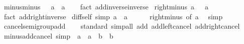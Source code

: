 \begin{isabellebody}
\endisatagproof
{\isafoldproof}%
%
\isadelimproof
\isanewline
%
\endisadelimproof
\isanewline
{}\isamarkupfalse%
\ minus{\isacharunderscore}{\kern0pt}minus{\isacharcolon}{\kern0pt}\ {\isachardoublequoteopen}{\isacharminus}{\kern0pt}\ {\isacharparenleft}{\kern0pt}{\isacharminus}{\kern0pt}\ a{\isacharparenright}{\kern0pt}\ {\isacharequal}{\kern0pt}\ a{\isachardoublequoteclose}\isanewline
%
\isadelimproof
\ \ %
\endisadelimproof
%
\isatagproof
{}\isamarkupfalse%
\ {\isacharparenleft}{\kern0pt}fact\ add{\isachardot}{\kern0pt}inverse{\isacharunderscore}{\kern0pt}inverse{\isacharparenright}{\kern0pt}%
\endisatagproof
{\isafoldproof}%
%
\isadelimproof
\isanewline
%
\endisadelimproof
\isanewline
{}\isamarkupfalse%
\ right{\isacharunderscore}{\kern0pt}minus{\isacharcolon}{\kern0pt}\ {\isachardoublequoteopen}a\ {\isacharplus}{\kern0pt}\ {\isacharminus}{\kern0pt}\ a\ {\isacharequal}{\kern0pt}\ {}{\isachardoublequoteclose}\isanewline
%
\isadelimproof
\ \ %
\endisadelimproof
%
\isatagproof
{}\isamarkupfalse%
\ {\isacharparenleft}{\kern0pt}fact\ add{\isachardot}{\kern0pt}right{\isacharunderscore}{\kern0pt}inverse{\isacharparenright}{\kern0pt}%
\endisatagproof
{\isafoldproof}%
%
\isadelimproof
\isanewline
%
\endisadelimproof
\isanewline
{}\isamarkupfalse%
\ diff{\isacharunderscore}{\kern0pt}self\ {\isacharbrackleft}{\kern0pt}simp{\isacharbrackright}{\kern0pt}{\isacharcolon}{\kern0pt}\ {\isachardoublequoteopen}a\ {\isacharminus}{\kern0pt}\ a\ {\isacharequal}{\kern0pt}\ {}{\isachardoublequoteclose}\isanewline
%
\isadelimproof
\ \ %
\endisadelimproof
%
\isatagproof
{}\isamarkupfalse%
\ right{\isacharunderscore}{\kern0pt}minus\ {\isacharbrackleft}{\kern0pt}of\ a{\isacharbrackright}{\kern0pt}\ \isamarkupfalse%
\ simp%
\endisatagproof
{\isafoldproof}%
%
\isadelimproof
\isanewline
%
\endisadelimproof
\isanewline
{}\isamarkupfalse%
\ cancel{\isacharunderscore}{\kern0pt}semigroup{\isacharunderscore}{\kern0pt}add\isanewline
%
\isadelimproof
\ \ %
\endisadelimproof
%
\isatagproof
{}\isamarkupfalse%
\ standard\ {\isacharparenleft}{\kern0pt}simp{\isacharunderscore}{\kern0pt}all\ add{\isacharcolon}{\kern0pt}\ add{\isachardot}{\kern0pt}left{\isacharunderscore}{\kern0pt}cancel\ add{\isachardot}{\kern0pt}right{\isacharunderscore}{\kern0pt}cancel{\isacharparenright}{\kern0pt}%
\endisatagproof
{\isafoldproof}%
%
\isadelimproof
\isanewline
%
\endisadelimproof
\isanewline
{}\isamarkupfalse%
\ minus{\isacharunderscore}{\kern0pt}add{\isacharunderscore}{\kern0pt}cancel\ {\isacharbrackleft}{\kern0pt}simp{\isacharbrackright}{\kern0pt}{\isacharcolon}{\kern0pt}\ {\isachardoublequoteopen}{\isacharminus}{\kern0pt}\ a\ {\isacharplus}{\kern0pt}\ {\isacharparenleft}{\kern0pt}a\ {\isacharplus}{\kern0pt}\ b{\isacharparenright}{\kern0pt}\ {\isacharequal}{\kern0pt}\ b{\isachardoublequoteclose}\isanewline

\end{isabellebody}
